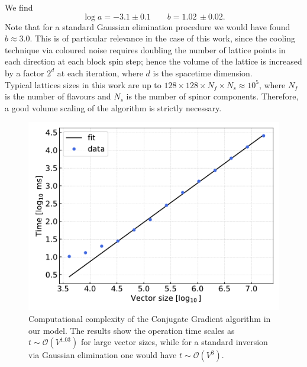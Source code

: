 We find 
\begin{equation*}
    \log a = -3.1 \pm 0.1 \qquad b = 1.02 \, \pm 0.02.
\end{equation*}
Note that for a standard Gaussian elimination procedure we would have found $b \approx 3.0$. This is of particular relevance in the case of this work, since the cooling technique via coloured noise requires doubling the number of lattice points in each direction at each block spin step; hence the volume of the lattice is increased by a factor $2^d$ at each iteration, where $d$ is the spacetime dimension. \\
Typical lattices sizes in this work are up to $128 \times 128 \times N_f \times N_s \approx 10^5$, where $N_f$ is the number of flavours and $N_s$ is the number of spinor components. Therefore, a good volume scaling of the algorithm is strictly necessary.
\begin{figure}[t]
    \centering
    \includegraphics[scale=0.65]{figures/complexity.pdf}
    \caption[Computational complexity of the Conjugate Gradient algorithm.]{Computational complexity of the Conjugate Gradient algorithm in our model. The results show the operation time scales as $t \sim \mathcal{O}(V^{1.03})$ for large vector sizes, while for a standard inversion via Gaussian elimination one would have $t \sim \mathcal{O}(V^3)$.}
    \label{fig:complexity}
\end{figure}


